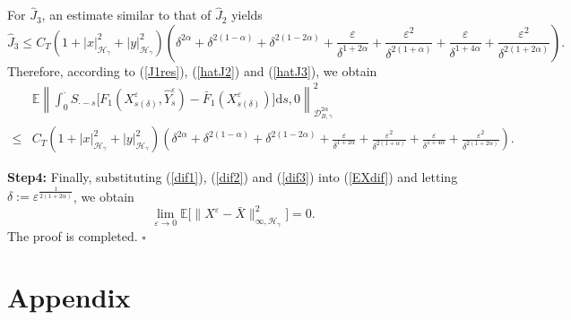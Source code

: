 \documentclass[10pt,a4paper]{article}
\numberwithin{equation}{section}
\begin{document}
For $\hat{J}_3$, an estimate similar to that of $\hat{J}_2$ yields
\begin{equation}\label{hatJ3}
\hat{J}_3\leq C_T(1+|x|_{\mathcal H_\gamma}^2+| y |_{\mathcal H_\gamma }^2) \left(\delta^{2\alpha}+\delta^{2(1-\alpha)}+\delta^{2(1-2\alpha)}+\frac {\varepsilon} {\delta^{1+2\alpha}} +\frac {\varepsilon^2} {\delta^{2(1+\alpha)}}+\frac {\varepsilon} {\delta^{1+4\alpha}} +\frac {\varepsilon^2} {\delta^{2(1+2\alpha)}} \right).
\end{equation}
Therefore, according to (\ref{J1res}), (\ref{hatJ2}) and (\ref{hatJ3}), we obtain
\begin{align}\label{dif3}
&\mathbb E \left\| \displaystyle\int_0^\cdot S_{\cdot-s} \big[F_1(X_{s(\delta)}^\varepsilon,\hat{Y}_s^\varepsilon)-\bar{F}_1(X_{s(\delta)}^\varepsilon) \big]\mathrm{d} s,0 \right\|_{\mathcal{D}_{B,\gamma}^{2\alpha}}^2 \nonumber\\
\leq & C_T(1+|x|_{\mathcal H_\gamma}^2+| y |_{\mathcal H_\gamma }^2) \left(\delta^{2\alpha}+\delta^{2(1-\alpha)}+\delta^{2(1-2\alpha)}+\frac {\varepsilon} {\delta^{1+2\alpha}} +\frac {\varepsilon^2} {\delta^{2(1+\alpha)}}+\frac {\varepsilon} {\delta^{1+4\alpha}} +\frac {\varepsilon^2} {\delta^{2(1+2\alpha)}} \right).
\end{align}




\textbf{Step4:} Finally, substituting (\ref{dif1}), (\ref{dif2}) and (\ref{dif3}) into (\ref{EXdif}) and letting $\delta:=\varepsilon^{\frac 1{2(1+2\alpha)}}$, we obtain
$$\lim_{\varepsilon \to 0} \mathbb E \big[\|X^\varepsilon-\bar{X}\|_{\infty, \mathcal H_\gamma}^2 \big]=0.$$
The proof is completed. \hfill $\square$

















		











\section{Appendix}\label{appendix}
\end{document}
